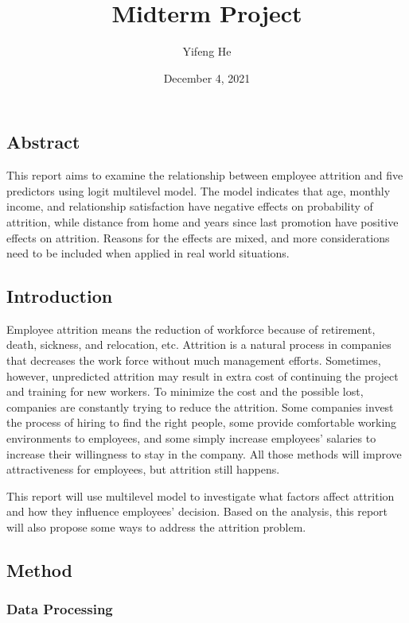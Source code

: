 \documentclass[
]{article}
\title{Midterm Project}
\author{Yifeng He}
\date{December 4, 2021}
\begin{document}
\maketitle

\hypertarget{abstract}{%
\subsection{Abstract}\label{abstract}}

This report aims to examine the relationship between employee attrition
and five predictors using logit multilevel model. The model indicates
that age, monthly income, and relationship satisfaction have negative
effects on probability of attrition, while distance from home and years
since last promotion have positive effects on attrition. Reasons for the
effects are mixed, and more considerations need to be included when
applied in real world situations.

\hypertarget{introduction}{%
\subsection{Introduction}\label{introduction}}

Employee attrition means the reduction of workforce because of
retirement, death, sickness, and relocation, etc. Attrition is a natural
process in companies that decreases the work force without much
management efforts. Sometimes, however, unpredicted attrition may result
in extra cost of continuing the project and training for new workers. To
minimize the cost and the possible lost, companies are constantly trying
to reduce the attrition. Some companies invest the process of hiring to
find the right people, some provide comfortable working environments to
employees, and some simply increase employees' salaries to increase
their willingness to stay in the company. All those methods will improve
attractiveness for employees, but attrition still happens.

This report will use multilevel model to investigate what factors affect
attrition and how they influence employees' decision. Based on the
analysis, this report will also propose some ways to address the
attrition problem.

\hypertarget{method}{%
\subsection{Method}\label{method}}

\hypertarget{data-processing}{%
\subsubsection{Data Processing}\label{data-processing}}
\end{document}
